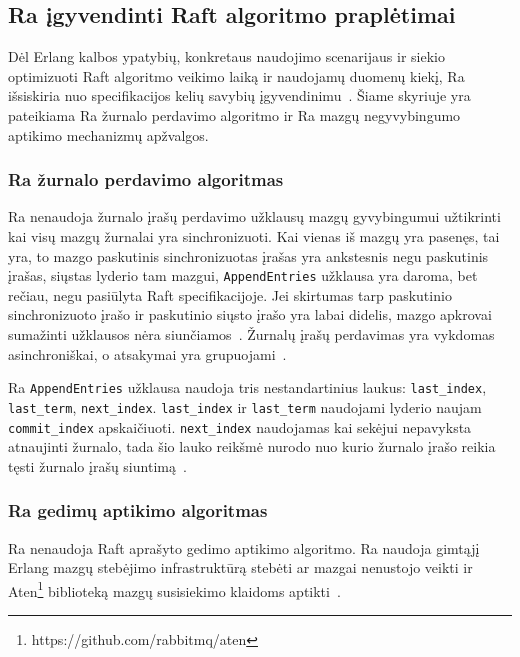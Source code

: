 \documentclass{VUMIFPSkursinis}
\begin{document}
\subsection{Ra įgyvendinti Raft algoritmo praplėtimai}

Dėl Erlang kalbos ypatybių, konkretaus naudojimo scenarijaus ir siekio optimizuoti Raft algoritmo veikimo laiką ir naudojamų duomenų kiekį, Ra išsiskiria nuo specifikacijos kelių savybių įgyvendinimu~\cite{rabbitmqra}. Šiame skyriuje yra pateikiama Ra žurnalo perdavimo algoritmo ir Ra mazgų negyvybingumo aptikimo mechanizmų apžvalgos. 

\subsubsection{Ra žurnalo perdavimo algoritmas}

Ra nenaudoja žurnalo įrašų perdavimo užklausų mazgų gyvybingumui užtikrinti kai visų mazgų žurnalai yra sinchronizuoti. Kai vienas iš mazgų yra pasenęs, tai yra, to mazgo paskutinis sinchronizuotas įrašas yra ankstesnis negu paskutinis įrašas, siųstas lyderio tam mazgui, \texttt{AppendEntries} užklausa yra daroma, bet rečiau, negu pasiūlyta Raft specifikacijoje. Jei skirtumas tarp paskutinio sinchronizuoto įrašo ir paskutinio siųsto įrašo yra labai didelis, mazgo apkrovai sumažinti užklausos nėra siunčiamos~\cite{rabbitmqra}. Žurnalų įrašų perdavimas yra vykdomas asinchroniškai, o atsakymai yra grupuojami~\cite{rabbitmqra}.

Ra \texttt{AppendEntries} užklausa naudoja tris nestandartinius laukus: \texttt{last\_index}, \texttt{last\_term}, \texttt{next\_index}. \texttt{last\_index} ir \texttt{last\_term} naudojami lyderio naujam \texttt{commit\_index} apskaičiuoti. \texttt{next\_index} naudojamas kai sekėjui nepavyksta atnaujinti žurnalo, tada šio lauko reikšmė nurodo nuo kurio žurnalo įrašo reikia tęsti žurnalo įrašų siuntimą~\cite{rabbitmqra}.

\subsubsection{Ra gedimų aptikimo algoritmas}

Ra nenaudoja Raft aprašyto gedimo aptikimo algoritmo. Ra naudoja gimtąjį Erlang mazgų stebėjimo infrastruktūrą stebėti ar mazgai nenustojo veikti ir Aten\footnote{https://github.com/rabbitmq/aten} biblioteką mazgų susisiekimo klaidoms aptikti~\cite{rabbitmqra}.
\end{document}
